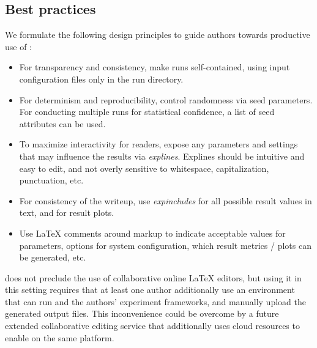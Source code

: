 \subsection{Best practices}
\label{sec:best-practices}

We formulate the following design principles to guide authors towards productive use of \sysname:

\begin{itemize}[leftmargin=10pt,itemsep=2pt,topsep=2pt]
    \item For transparency and consistency, make runs self-contained, using input configuration files only in the run directory.
    \item For determinism and reproducibility, control randomness via seed parameters. For conducting multiple runs for statistical confidence, a list of seed attributes can be used.
    \item To maximize interactivity for readers, expose any parameters and settings that may influence the results via \textit{explines}. Explines should be intuitive and easy to edit, and not overly sensitive to whitespace, capitalization, punctuation, etc.
    \item For consistency of the writeup, use \textit{expincludes} for all possible result values in text, and for result plots.
    \item Use \LaTeX{} comments around markup to indicate acceptable values for parameters, options for system configuration, which result metrics / plots can be generated, etc.
\end{itemize}


\noindent \sysname does not preclude the use of collaborative online \LaTeX{} editors, but using it in this setting requires that at least one author additionally use an environment that can run \sysname and the authors' experiment frameworks, and manually upload the generated output files. This inconvenience could be overcome by a future extended collaborative editing service that additionally uses cloud resources to enable \sysname on the same platform.
